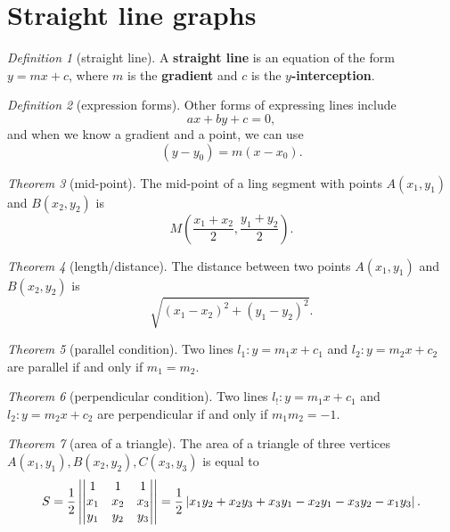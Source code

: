 \documentclass[8pt]{article}
\theoremstyle{remark}
\newtheorem{theorem}{Theorem}[section]
\newtheorem{definition}[theorem]{Definition}
\begin{document}
    \section{Straight line graphs}
        \begin{definition}[straight line]
            A \textbf{straight line} is an equation of the form $y = mx + c$, where $m$ is the \textbf{gradient} and $c$ is the \textbf{$y$-interception}.
        \end{definition}

        \begin{definition}[expression forms]
            Other forms of expressing lines include
            $$
                ax + by + c = 0,
            $$
            and when we know a gradient and a point, we can use
            $$
                (y - y_0) = m(x - x_0).
            $$
        \end{definition}

        \begin{theorem}[mid-point]
            The mid-point of a ling segment with points $A(x_1, y_1)$ and $B(x_2, y_2)$ is
            $$
                M\left(\frac{x_1 + x_2}{2}, \frac{y_1 + y_2}{2}\right).
            $$
        \end{theorem}

        \begin{theorem}[length/distance]
            The distance between two points $A(x_1, y_1)$ and $B(x_2, y_2)$ is
            $$
                \sqrt{(x_1 - x_2)^2 + (y_1 - y_2)^2}.
            $$
        \end{theorem}

        \begin{theorem}[parallel condition]
            Two lines $l_1: y = m_1 x + c_1$ and $l_2: y = m_2 x + c_2$ are parallel if and only if $m_1 = m_2$.
        \end{theorem}

        \begin{theorem}[perpendicular condition]
            Two lines $l_!: y = m_1 x + c_1$ and $l_2: y = m_2 x + c_2$ are perpendicular if and only if $m_1 m_2 = -1$.
        \end{theorem}

        \begin{theorem}[area of a triangle]
            The area of a triangle of three vertices $A(x_1, y_1), B(x_2, y_2), C(x_3, y_3)$ is equal to
            $$
                S = \frac{1}{2} \left\lvert \begin{vmatrix}
                    1 & 1 & 1\\
                    x_1 & x_2 & x_3\\
                    y_1 & y_2 & y_3
                \end{vmatrix} \right\rvert
                = \frac{1}{2} \left\lvert x_1 y_2 + x_2 y_3 + x_3 y_1 - x_2 y_1 - x_3 y_2 - x_1 y_3 \right\rvert.
            $$
        \end{theorem}
\end{document}

